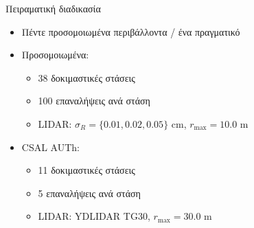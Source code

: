 \begin{frame}{Πειραματική διαδικασία}

  \begin{itemize}
    \item Πέντε προσομοιωμένα περιβάλλοντα / ένα πραγματικό
    \item Προσομοιωμένα:
      \begin{itemize}
        \item 38 δοκιμαστικές στάσεις
        \item 100 επαναλήψεις ανά στάση
        \item LIDAR: $\sigma_R = \{0.01, 0.02, 0.05\}$ cm, $r_{\max} = 10.0$ m
      \end{itemize}
    \item CSAL AUTh:
      \begin{itemize}
        \item 11 δοκιμαστικές στάσεις
        \item 5 επαναλήψεις ανά στάση
        \item LIDAR: YDLIDAR TG30, $r_{\max} = 30.0$ m \\


\end{itemize}
\end{itemize}
\end{frame}
